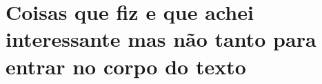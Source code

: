 \chapter{Coisas que fiz e que achei interessante mas não tanto para entrar no corpo do texto}

\lipsum[50]